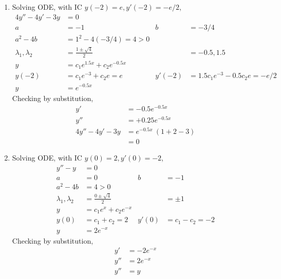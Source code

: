 \begin{enumerate}
    \item Solving ODE, with IC $ y(-2) = e, y'(-2) = -e/2 $,
          \begin{align}
              4y'' -4y' - 3y           & = 0                                   \\
              a                        & = -1                                &
              b                        & = -3/4                                \\
              a^{2} - 4b               & = 1^{2} - 4(-3/4) = 4 > 0             \\
              \lambda_{1}, \lambda_{2} & = \frac{1 \pm \sqrt{4}}{2}          &
                                       & = -0.5, 1.5                           \\
              y                        & = c_{1}e^{1.5x} + c_{2}e^{-0.5x}      \\
              y(-2)                    & = c_{1}e^{-3} + c_{2}e = e          &
              y'(-2)                   & = 1.5c_{1}e^{-3} - 0.5c_{2}e = -e/2   \\
              y                        & = e^{-0.5x}
          \end{align}
          Checking by substitution,
          \begin{align}
              y'              & = -0.5e^{-0.5x}          \\
              y''             & = + 0.25e^{-0.5x}        \\
              4y'' - 4y' - 3y & = e^{-0.5x}\ (1 + 2 - 3) \\
                              & = 0
          \end{align}

    \item Solving ODE, with IC $ y(0) = 2 , y'(0) = -2$,
          \begin{align}
              y'' - y                  & = 0                          \\
              a                        & = 0                        &
              b                        & = -1                         \\
              a^{2} - 4b               & = 4 > 0                      \\
              \lambda_{1}, \lambda_{2} & = \frac{0 \pm \sqrt{4}}{2} &
                                       & = \pm 1                      \\
              y                        & = c_{1}e^{x} + c_{2}e^{-x}   \\
              y(0)                     & = c_{1} + c_{2} = 2        &
              y'(0)                    & = c_{1} - c_{2} = -2         \\
              y                        & = 2e^{-x}
          \end{align}
          Checking by substitution,
          \begin{align}
              y'  & = -2e^{-x} \\
              y'' & = 2e^{-x}  \\
              y'' & = y
          \end{align}


\end{enumerate}
